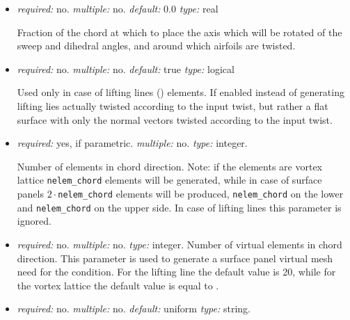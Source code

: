 \begin{itemize}
  \item {} \textit{required:} no. 
  \textit{multiple:} no. \textit{default:} 0.0 \textit{type:} real

  Fraction of the chord at which to place the axis which will be rotated of the sweep and dihedral angles, and 
  around which airfoils are twisted. 

  \item {} \textit{required:} no. \textit{multiple:} no. 
  \textit{default:} true \textit{type:} logical

  Used only in case of lifting lines () elements. If enabled instead of generating lifting lies 
  actually twisted according to the input twist, but rather a flat surface with only the normal vectors twisted 
  according to the input twist. 

  \item {} \textit{required:} yes, if parametric. \textit{multiple:} no. \textit{type:} integer.

  Number of elements in chord direction. Note: if the elements are vortex lattice \texttt{nelem\_chord} 
  elements will be generated, while in case of surface panels $2\cdot$\texttt{nelem\_chord} elements will be produced, 
  \texttt{nelem\_chord} on the lower and \texttt{nelem\_chord} on the upper side. In case of lifting lines this parameter is ignored.

  \item {} \textit{required:} no. \textit{multiple:} no. \textit{type:} integer. 
  Number of virtual elements in chord direction. This parameter is used to generate a surface panel virtual mesh need for the  
  condition. For the lifting line the default value is 20, while for the vortex lattice the default value is equal to . 

  \item {} \textit{required:} no. \textit{multiple:} no. 
  \textit{default:} uniform \textit{type:} string.


\end{itemize}
